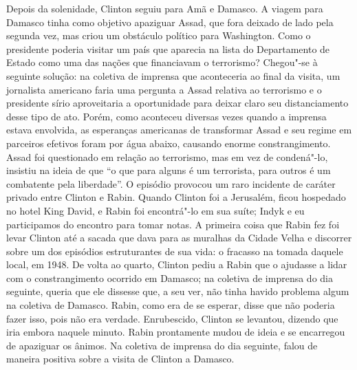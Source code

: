 Depois da solenidade, Clinton seguiu para Amã e Damasco. A viagem para
Damasco tinha como objetivo apaziguar Assad, que fora deixado de lado
pela segunda vez, mas criou um obstáculo político para
Washington. Como o presidente poderia visitar um país que aparecia na
lista do Departamento de Estado como uma das nações que financiavam o
terrorismo? Chegou"-se à seguinte solução: na coletiva de imprensa que
aconteceria ao final da visita, um jornalista americano faria uma
pergunta a Assad relativa ao terrorismo e o presidente sírio aproveitaria
a oportunidade para deixar claro seu distanciamento desse tipo de ato.
Porém, como aconteceu diversas vezes quando a imprensa estava envolvida,
as esperanças americanas de transformar Assad e seu regime em parceiros
efetivos foram por água abaixo, causando enorme constrangimento. Assad
foi questionado em relação ao terrorismo, mas em vez de condená"-lo,
insistiu na ideia de que ``o que para alguns é um terrorista, para
outros é um combatente pela liberdade''. O episódio provocou um raro
incidente de caráter privado entre Clinton e Rabin. Quando Clinton foi a
Jerusalém, ficou hospedado no hotel King David, e Rabin foi
encontrá"-lo em sua suíte; Indyk e eu participamos do encontro para tomar
notas. A primeira coisa que Rabin fez foi levar Clinton até a sacada que
dava para as muralhas da Cidade Velha e discorrer sobre um dos episódios
estruturantes de sua vida: o fracasso na tomada daquele local, em
1948. De volta ao quarto, Clinton pediu a Rabin que o ajudasse a lidar
com o constrangimento ocorrido em Damasco; na coletiva de imprensa do
dia seguinte, queria que ele dissesse que, a seu ver, não tinha havido
problema algum na coletiva de Damasco. Rabin, como era de se esperar,
disse que não poderia fazer isso, pois não era verdade. Enrubescido,
Clinton se levantou, dizendo que iria embora naquele minuto. Rabin
prontamente mudou de ideia e se encarregou de apaziguar os ânimos. Na
coletiva de imprensa do dia seguinte, falou de maneira positiva sobre a
visita de Clinton a Damasco.

